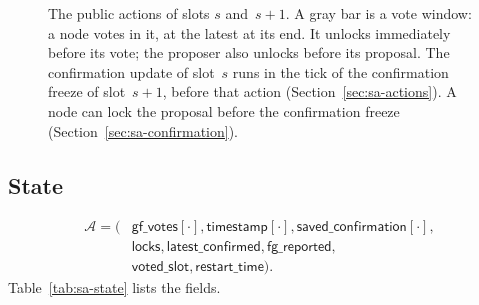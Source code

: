 \documentclass{article}
\newcommand{\AC}{\mathcal A}
\newcommand{\gfPool}{\mathsf{gf\_votes}}
\newcommand{\latestConfirmed}{\mathsf{latest\_confirmed}}
\newcommand{\timestamp}{\mathsf{timestamp}}
\newcommand{\savedConfirmation}{\mathsf{saved\_confirmation}}
\newcommand{\locks}{\mathsf{locks}}
\newcommand{\restartTime}{\mathsf{restart\_time}}
\newcommand{\fgReported}{\mathsf{fg\_reported}}
\newcommand{\votedSlot}{\mathsf{voted\_slot}}
\begin{document}
\begin{figure}[!ht]
\caption{The public actions of slots $s$ and~$s+1$.  A gray bar is a
vote window: a node votes in it, at the latest at its end.  It unlocks
immediately before its vote; the proposer also unlocks before its
proposal.  The confirmation update of slot~$s$ runs in the tick of the
confirmation freeze of slot~$s+1$, before that action
(Section~\ref{sec:sa-actions}).  A node can lock the proposal before the
confirmation freeze (Section~\ref{sec:sa-confirmation}).}
\label{fig:sa-timeline}
\end{figure}

\subsection{State}\label{sec:sa-state}

\[
\begin{split}
 \AC=(&\gfPool[\cdot],\timestamp[\cdot],\savedConfirmation[\cdot],\\
 &\locks,\latestConfirmed,\fgReported,\\
 &\votedSlot,\restartTime).
\end{split}
\]
Table~\ref{tab:sa-state} lists the fields.
\end{document}
